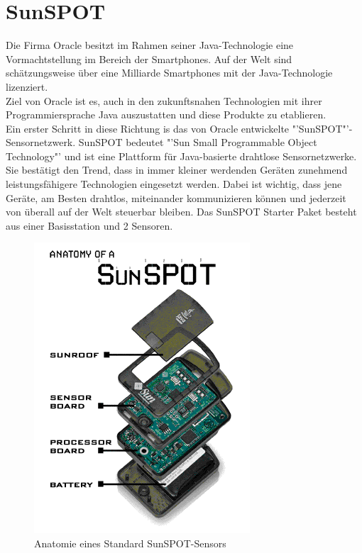 \section{SunSPOT}\label{s:Sunspot}

Die Firma Oracle besitzt im Rahmen seiner Java-Technologie eine Vormachtstellung im Bereich der Smartphones.
Auf der Welt sind schätzungsweise über eine Milliarde Smartphones mit der Java-Technologie lizenziert. \cite{d:horan} \\ Ziel von Oracle ist es, auch in den zukunftsnahen Technologien mit ihrer Programmiersprache Java auszustatten und diese Produkte zu etablieren.\\

Ein erster Schritt in diese Richtung is das von Oracle entwickelte "'SunSPOT"'-Sensornetzwerk. SunSPOT bedeutet "'Sun Small Programmable Object Technology"' und ist eine Plattform für Java-basierte drahtlose Sensornetzwerke. Sie bestätigt den Trend, dass in immer kleiner werdenden Geräten zunehmend leistungsfähigere Technologien eingesetzt werden. Dabei ist wichtig, dass jene Geräte, am Besten drahtlos, miteinander kommunizieren können und jederzeit von überall auf der Welt steuerbar bleiben. Das SunSPOT Starter Paket besteht aus einer Basisstation und 2 Sensoren. \\

\begin{figure}[H] 
	\centering
	\includegraphics[scale=0.5]{Bilder/spotanatomy}
	\caption{Anatomie eines Standard SunSPOT-Sensors}
	\label{f:spotaufbau}
\end{figure}

